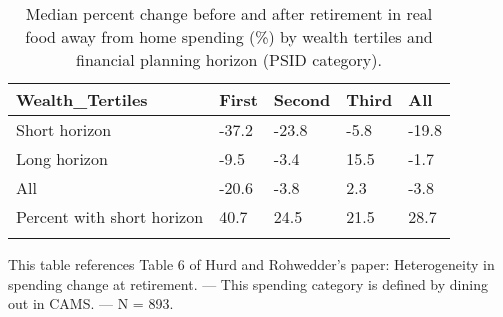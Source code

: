 \begin{table}[tbp] \centering
{}

\caption{Median percent change before and after retirement in real food away from home spending (\%) by wealth tertiles and financial planning horizon (PSID category).}
\begin{tabularx}{\textwidth}{lCCCC}

\toprule
{Wealth\_Tertiles}&{First}&{Second}&{Third}&{All} \tabularnewline
\midrule\addlinespace[1.5ex]
Short horizon&-37.2&-23.8&-5.8&-19.8 \tabularnewline
Long horizon&-9.5&-3.4&15.5&-1.7 \tabularnewline
All&-20.6&-3.8&2.3&-3.8 \tabularnewline
Percent with short horizon&40.7&24.5&21.5&28.7 \tabularnewline
\bottomrule \addlinespace[1.5ex]

\end{tabularx}
\begin{flushleft}
\footnotesize This table references Table 6 of Hurd and Rohwedder's paper: Heterogeneity in spending change at retirement. \linebreak --- \linebreak This spending category is defined by dining out in CAMS. \linebreak --- \linebreak N = 893.
\end{flushleft}
\end{table}
